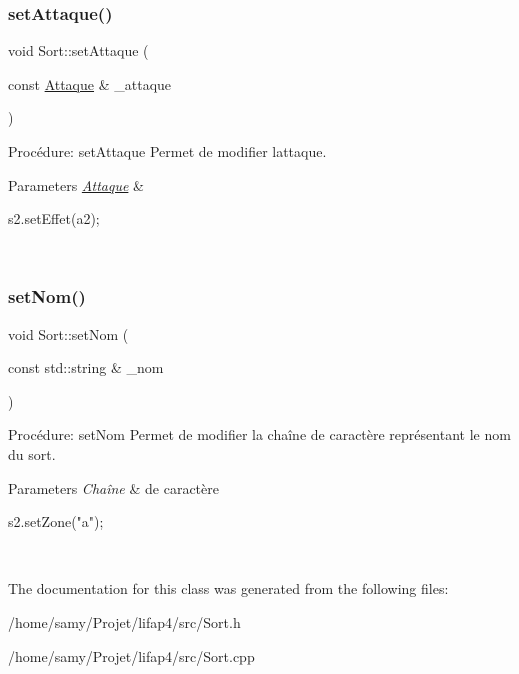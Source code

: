 \subsubsection{\texorpdfstring{set\+Attaque()}{setAttaque()}}
{\footnotesize\ttfamily void Sort\+::set\+Attaque (\begin{DoxyParamCaption}\item[{const \hyperlink{classAttaque}{Attaque} \&}]{\+\_\+attaque }\end{DoxyParamCaption})}



Procédure\+: set\+Attaque Permet de modifier l\textquotesingle{}attaque. 


\begin{DoxyParams}{Parameters}
{\em \hyperlink{classAttaque}{Attaque}} & 
\begin{DoxyCode}
s2.setEffet(a2);
\end{DoxyCode}
 \\
\hline
\end{DoxyParams}
\mbox{\label{classSort_af1eb5e9ab593b1c6b9e1d94ad1117b4f}} 
\subsubsection{\texorpdfstring{set\+Nom()}{setNom()}}
{\footnotesize\ttfamily void Sort\+::set\+Nom (\begin{DoxyParamCaption}\item[{const std\+::string \&}]{\+\_\+nom }\end{DoxyParamCaption})}



Procédure\+: set\+Nom Permet de modifier la chaîne de caractère représentant le nom du sort. 


\begin{DoxyParams}{Parameters}
{\em Chaîne} & de caractère 
\begin{DoxyCode}
s2.setZone(\textcolor{stringliteral}{"a"});
\end{DoxyCode}
 \\
\hline
\end{DoxyParams}


The documentation for this class was generated from the following files\+:\begin{DoxyCompactItemize}
\item 
/home/samy/\+Projet/lifap4/src/Sort.\+h\item 
/home/samy/\+Projet/lifap4/src/Sort.\+cpp\end{DoxyCompactItemize}
